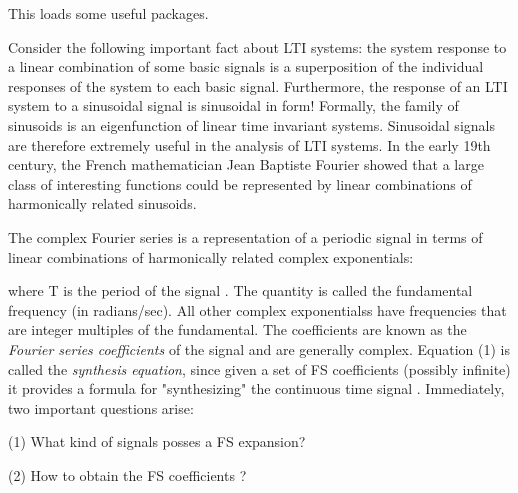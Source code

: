 \documentclass{article}
\begin{document}
This loads some useful packages.

\begin{CellGroup}
Consider the following important fact about LTI systems: the system response to a linear combination of some basic signals is a superposition of
the individual responses of the system to each basic signal. Furthermore, the response of an LTI system to a sinusoidal signal is sinusoidal in form!
Formally, the family of sinusoids is an eigenfunction of linear time invariant systems. Sinusoidal signals are therefore extremely useful in the
analysis of LTI systems. In the early 19th century, the French mathematician Jean Baptiste Fourier showed that a large class of interesting functions
could be represented by linear combinations of harmonically related sinusoids. 

The complex Fourier series is a representation of a periodic signal in terms of linear combinations of harmonically related complex exponentials:


where T is the period of the signal . The quantity  is called the fundamental frequency (in radians/sec). All other complex exponentialss have frequencies that are integer multiples of
the fundamental. The coefficients  are known as the {\itshape Fourier series coefficients} of the signal 
and are generally complex. Equation (1) is called the {\itshape synthesis equation}, since given a set of FS coefficients (possibly infinite) it
provides a formula for "synthesizing" the continuous time signal . Immediately, two important questions arise:

(1) What kind of signals posses a FS expansion?

(2) How to obtain the FS coefficients ?


\end{CellGroup}
\end{document}
